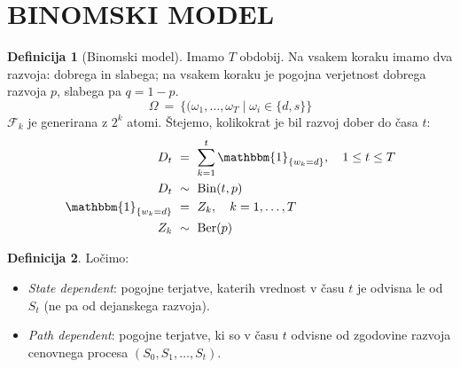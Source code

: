 \documentclass[11pt]{article}
\newcommand{\F}{\mathcal{F}}
\newcommand{\1}{\mathbbm{1}}
\theoremstyle{definition}
\newtheorem{definicija}{Definicija}[section]
\theoremstyle{definition}
\begin{document}
\pagebreak


\section{BINOMSKI MODEL}
\vspace{0.5cm}

\begin{definicija}[Binomski model]

Imamo $T$ obdobij. Na vsakem koraku imamo dva razvoja: dobrega in slabega; na vsakem koraku je pogojna verjetnost dobrega razvoja $p$, slabega pa $q = 1-p$. 
$$\Omega ~=~ \{(\omega_1,\ldots, \omega_T \mid \omega_i \in \{d, s\}\}$$
$\F_k$ je generirana z $2^k$ atomi. Štejemo, kolikokrat je bil razvoj dober do časa $t$:
\begin{align*}
D_t ~&=~ \sum_{k=1}^t \1_{\{w_k = d\}}, ~~~1 \leq t \leq T \\
D_t ~&\sim~ \text{Bin}(t, p) \\
\1_{\{w_k = d\}} ~&=~ Z_k, ~~~k = 1,\ldots,T \\
Z_k ~&\sim~ \text{Ber}(p)
\end{align*}

\end{definicija}
\vspace{0.5cm}

\begin{definicija}

Ločimo:
\begin{itemize}

	\item \textit{State dependent}: pogojne terjatve, katerih vrednost v času $t$ je odvisna le od $S_t$ (ne pa od dejanskega razvoja).
	
	\item \textit{Path dependent}: pogojne terjatve, ki so v času $t$ odvisne od zgodovine razvoja cenovnega procesa $(S_0, S_1, \ldots, S_t)$.

\end{itemize}

\end{definicija}
\vspace{0.5cm}
\end{document}
